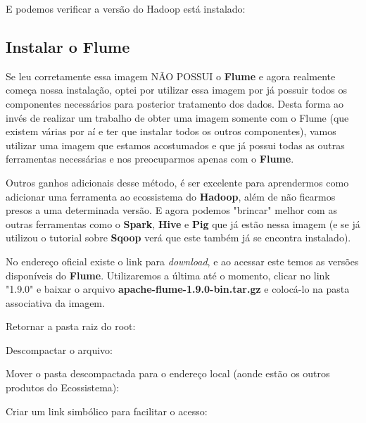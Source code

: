 \documentclass[a4paper,11pt]{article}
\begin{document}


E podemos verificar a versão do Hadoop está instalado: \\

\subsection{Instalar o Flume}
Se leu corretamente essa imagem NÃO POSSUI o \textbf{Flume} e agora realmente começa nossa instalação, optei por utilizar essa imagem por já possuir todos os componentes necessários para posterior tratamento dos dados. Desta forma ao invés de realizar um trabalho de obter uma imagem somente com o Flume (que existem várias por aí e ter que instalar todos os outros componentes), vamos utilizar uma imagem que estamos acostumados e que já possui todas as outras ferramentas necessárias e nos preocuparmos apenas com o \textbf{Flume}.

Outros ganhos adicionais desse método, é ser excelente para aprendermos como adicionar uma ferramenta ao ecossistema do \textbf{Hadoop}, além de não ficarmos presos a uma determinada versão. E agora podemos "brincar" melhor com as outras ferramentas como o \textbf{Spark}, \textbf{Hive} e \textbf{Pig} que já estão nessa imagem (e se já utilizou o tutorial sobre \textbf{Sqoop} verá que este também já se encontra instalado).

No endereço oficial \cite{flumeoficial} existe o link para \textit{download}, e ao acessar este temos as versões disponíveis do \textbf{Flume}. Utilizaremos a última até o momento, clicar no link "1.9.0" e baixar o arquivo \textbf{apache-flume-1.9.0-bin.tar.gz} e colocá-lo na pasta associativa da imagem.

Retornar a pasta raiz do root: \\

Descompactar o arquivo: \\

Mover o pasta descompactada para o endereço local (aonde estão os outros produtos do Ecossistema): \\

Criar um link simbólico para facilitar o acesso: \\
 \\
\end{document}
